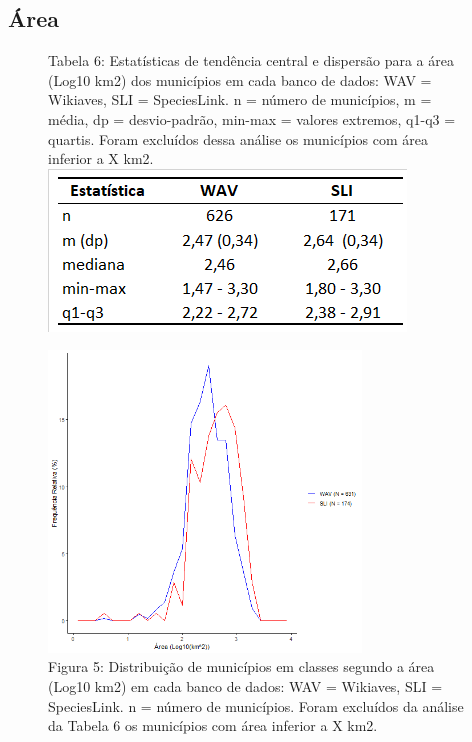 \newpage

\subsection{Área}

\begin{figure}[h!]
\centering
{\scriptsize Tabela 6: Estatísticas de tendência central e dispersão para a área (Log10 km2) dos municípios em cada banco de dados: WAV = Wikiaves, SLI = SpeciesLink. n = número de municípios, m = média, dp = desvio-padrão, min-max = valores extremos, q1-q3 = quartis. Foram excluídos dessa análise os municípios com área inferior a X km2.}
\includegraphics{Tabelas/6.png}
\end{figure}

\texto



\begin{figure}[h!]
\centering
\includegraphics[height = 8cm]{Imagens/223.png}
\\{\scriptsize Figura 5: Distribuição de municípios em classes segundo a área (Log10 km2) em cada banco de dados: WAV = Wikiaves, SLI = SpeciesLink. n = número de municípios. Foram excluídos da análise da Tabela 6 os municípios com área inferior a X km2.}
\end{figure}

